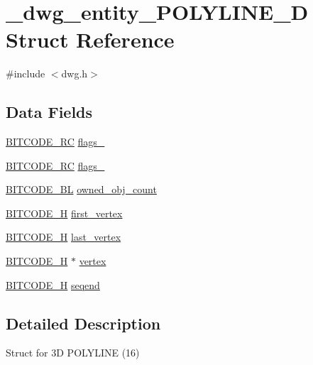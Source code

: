 \hypertarget{struct__dwg__entity__POLYLINE__3D}{\section{\-\_\-dwg\-\_\-entity\-\_\-\-P\-O\-L\-Y\-L\-I\-N\-E\-\_\-D \-Struct \-Reference}
\label{struct__dwg__entity__POLYLINE__3D}
}


{\ttfamily \#include $<$dwg.\-h$>$}

\subsection*{\-Data \-Fields}
\begin{DoxyCompactItemize}
\item 
\hyperlink{dwg_8h_a7fd199a8f9c9cc52bdab220f65a2a619}{\-B\-I\-T\-C\-O\-D\-E\-\_\-\-R\-C} \hyperlink{struct__dwg__entity__POLYLINE__3D_a4c87bb77ec5b0c6160a87e18d39f33f7}{flags\-\_}
\item 
\hyperlink{dwg_8h_a7fd199a8f9c9cc52bdab220f65a2a619}{\-B\-I\-T\-C\-O\-D\-E\-\_\-\-R\-C} \hyperlink{struct__dwg__entity__POLYLINE__3D_a7b909e06a8814876dd1b1b29f81c8ab4}{flags\-\_}
\item 
\hyperlink{dwg_8h_aebd5f127038868cbabc3d55d91da776c}{\-B\-I\-T\-C\-O\-D\-E\-\_\-\-B\-L} \hyperlink{struct__dwg__entity__POLYLINE__3D_a30b3661624a2e97e54324fb0825171a5}{owned\-\_\-obj\-\_\-count}
\item 
\hyperlink{dwg_8h_a7c700e94e047a97ba8c24bdfe4029dc3}{\-B\-I\-T\-C\-O\-D\-E\-\_\-\-H} \hyperlink{struct__dwg__entity__POLYLINE__3D_afe966d2c09bf82e005a23052c271465a}{first\-\_\-vertex}
\item 
\hyperlink{dwg_8h_a7c700e94e047a97ba8c24bdfe4029dc3}{\-B\-I\-T\-C\-O\-D\-E\-\_\-\-H} \hyperlink{struct__dwg__entity__POLYLINE__3D_a31a71fba5d0ce21aeb235e00af945589}{last\-\_\-vertex}
\item 
\hyperlink{dwg_8h_a7c700e94e047a97ba8c24bdfe4029dc3}{\-B\-I\-T\-C\-O\-D\-E\-\_\-\-H} $\ast$ \hyperlink{struct__dwg__entity__POLYLINE__3D_a9bb54af0b95daba243f02a9d30f4ecce}{vertex}
\item 
\hyperlink{dwg_8h_a7c700e94e047a97ba8c24bdfe4029dc3}{\-B\-I\-T\-C\-O\-D\-E\-\_\-\-H} \hyperlink{struct__dwg__entity__POLYLINE__3D_ac3442854ed64bf286981996c2a4e2162}{seqend}
\end{DoxyCompactItemize}


\subsection{\-Detailed \-Description}
\-Struct for 3\-D \-P\-O\-L\-Y\-L\-I\-N\-E (16) 

